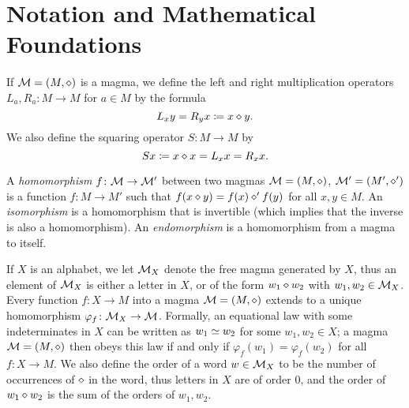 \section{Notation and Mathematical Foundations}\label{notation-sec}

If ${\mathcal{M}} = (M,\diamond)$ is a magma, we define the left and right multiplication operators $L_a, R_a \colon M \to M$ for $a \in M$ by the formula
\begin{equation}\label{left-right}
    L_x y = R_y x \coloneqq x \diamond y.
\end{equation}
We also define the squaring operator $S \colon M \to M$ by
\begin{equation}\label{square-def}
    Sx \coloneqq x \diamond x = L_x x = R_x x.
\end{equation}

A \emph{homomorphism} $f \colon {\mathcal{M}} \to {\mathcal{M}}'$ between two magmas ${\mathcal{M}} = (M,\diamond)$, ${\mathcal{M}}' = (M',\diamond')$ is a function $f \colon M \to M'$ such that $f(x \diamond y) = f(x) \diamond' f(y)$ for all $x,y \in M$.  An \emph{isomorphism} is a homomorphism that is invertible (which implies that the inverse is also a homomorphism).  An \emph{endomorphism} is a homomorphism from a magma to itself.

If $X$ is an alphabet, we let ${\mathcal{M}}_X$ denote the free magma generated by $X$, thus an element of ${\mathcal{M}}_X$ is either a letter in $X$, or of the form $w_1 \diamond w_2$ with $w_1,w_2 \in {\mathcal{M}}_X$.  Every function $f \colon X \to M$ into a magma ${\mathcal{M}} = (M,\diamond)$ extends to a unique homomorphism $\varphi_f \colon {\mathcal{M}}_X \to {\mathcal{M}}$.  Formally, an equational law with some indeterminates in $X$ can be written as $w_1 \simeq w_2$ for some $w_1, w_2 \in X$; a magma ${\mathcal{M}} = (M,\diamond)$ then obeys this law if and only if $\varphi_f(w_1) = \varphi_f(w_2)$ for all $f \colon X \to M$.  We also define the order of a word $w \in {\mathcal{M}}_X$ to be the number of occurrences of $\diamond$ in the word, thus letters in $X$ are of order $0$, and the order of $w_1 \diamond w_2$ is the sum of the orders of $w_1, w_2$.

